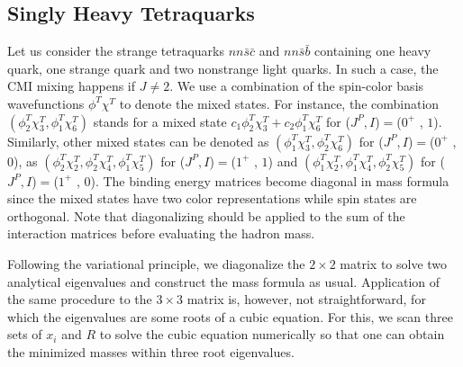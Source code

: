\documentclass[12pt,prd,onecolumn,floatfix,nofootinbib]{revtex4}
\begin{document}
\subsection{Singly Heavy Tetraquarks}

Let us consider the strange tetraquarks $nn\bar{s}\bar{c}$ and $nn\bar{s}%
\bar{b}$ containing one heavy quark, one strange quark and two nonstrange
light quarks. In such a case, the CMI mixing happens if $J\neq 2$. We use a
combination of the spin-color basis wavefunctions $\phi ^{T}\chi ^{T}$ to denote
the mixed states. For instance, the combination $(\phi _{2}^{T}\chi
_{3}^{T},\phi _{1}^{T}\chi _{6}^{T})$ stands for a mixed state $c_{1}\phi
_{2}^{T}\chi _{3}^{T}+c_{2}\phi _{1}^{T}\chi _{6}^{T}$ for ($J^{P},I$)$=$($%
0^{+}$ , $1$). Similarly, other mixed states can be denoted as $(\phi
_{1}^{T}\chi _{3}^{T},\phi _{2}^{T}\chi _{6}^{T})$ for ($J^{P},I$)$=$($0^{+}$
, $0$), as $(\phi _{2}^{T}\chi _{2}^{T},\phi _{2}^{T}\chi _{4}^{T},\phi
_{1}^{T}\chi _{5}^{T})$ for ($J^{P},I$)$=$($1^{+}$ , $1$) and $(\phi
_{1}^{T}\chi _{2}^{T},\phi _{1}^{T}\chi _{4}^{T},\phi _{2}^{T}\chi _{5}^{T})$
for ($J^{P},I$)$=$($1^{+}$ , $0$). The binding energy matrices become
diagonal in mass formula since the mixed states have two color
representations while spin states are orthogonal. Note that diagonalizing
should be applied to the sum of the interaction matrices before evaluating
the hadron mass.

Following the variational principle, we diagonalize the $2\times 2$ matrix
to solve two analytical eigenvalues and construct the mass formula as usual.
Application of the same procedure to the $3\times 3$ matrix is, however, not
straightforward, for which the eigenvalues are some roots of a cubic
equation. For this, we scan three sets of $x_{i}$ and $R$ to solve the cubic
equation numerically so that one can obtain the minimized masses within
three root eigenvalues.
\end{document}
